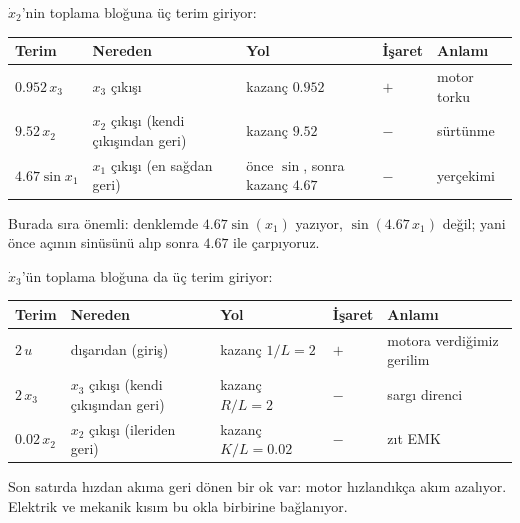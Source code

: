\documentclass[11pt,a4paper]{article}
\begin{document}
$\dot x_2$'nin toplama bloğuna üç terim giriyor:

\begin{center}
\small\begin{tabular}{lllll}
\toprule
Terim & Nereden & Yol & İşaret & Anlamı\\
\midrule
$0.952\,x_3$ & $x_3$ çıkışı & kazanç $0.952$ & $+$ & motor torku\\
$9.52\,x_2$ & $x_2$ çıkışı (kendi çıkışından geri) & kazanç $9.52$ & $-$ & sürtünme\\
$4.67\sin x_1$ & $x_1$ çıkışı (en sağdan geri) & önce $\sin$, sonra kazanç $4.67$ & $-$ & yerçekimi\\
\bottomrule
\end{tabular}
\end{center}

Burada sıra önemli: denklemde $4.67\sin(x_1)$ yazıyor, $\sin(4.67\,x_1)$ değil; yani önce açının sinüsünü alıp sonra $4.67$ ile çarpıyoruz.

$\dot x_3$'ün toplama bloğuna da üç terim giriyor:

\begin{center}
\small\begin{tabular}{lllll}
\toprule
Terim & Nereden & Yol & İşaret & Anlamı\\
\midrule
$2\,u$ & dışarıdan (giriş) & kazanç $1/L = 2$ & $+$ & motora verdiğimiz gerilim\\
$2\,x_3$ & $x_3$ çıkışı (kendi çıkışından geri) & kazanç $R/L = 2$ & $-$ & sargı direnci\\
$0.02\,x_2$ & $x_2$ çıkışı (ileriden geri) & kazanç $K/L = 0.02$ & $-$ & zıt EMK\\
\bottomrule
\end{tabular}
\end{center}

Son satırda hızdan akıma geri dönen bir ok var: motor hızlandıkça akım azalıyor. Elektrik ve mekanik kısım bu okla birbirine bağlanıyor.
\end{document}
